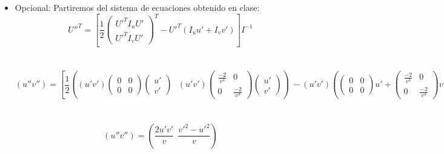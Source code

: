 \documentclass[12pt,a4paper]{article}
\begin{document}
\begin{enumerate}
\begin{center}
  \end{center}
  \begin{itemize}
     \item Opcional:
       Partiremos del sistema de ecuaciones obtenido en clase:
       $$U''^{T} = \left[ \frac{1}{2}
        \left( \begin{array}{c}
           U'^{T}I_{u}U' \\
           U'^{T}I_{v}U'
           \end{array}\right)^{T}-U'^{T}\left(I_{u}u'+I_{v}v'\right)\right]I^{-1} $$\\ \\
 $$\left(u'' v''\right) = \left[ \frac{1}{2}
        \left(
           \left(u' v'\right)
           \left(\begin{array}{cc}
             0 & 0 \\ 
             0 & 0 
           \end{array}\right)
           \left(\begin{array} {c}
             u' \\
             v' 
           \end{array}\right)\ \ \ \left(u' v'\right)
           \left(\begin{array} {cc}
             \frac{-2}{v^{3}} & 0 \\ 
             0 &  \frac{-2}{v^{3}} 
           \end{array}\right)
           \left(\begin{array}{c}
             u' \\ 
             v' 
          
        \end{array} \right) \right)
           \ -
           \left(u' v'\right)
           \left(
           \left(\begin{array}{cc}
             0 & 0 \\ 
             0 & 0 
           \end{array}\right)u'
           +
           \left(\begin{array}{cc}
             \frac{-2}{v^{3}} & 0 \\ 
             0 & \frac{-2}{v^{3}} 
           \end{array}\right)v'\right)\right]
       \left(\begin{array}{cc} 
             v^{2} & 0 \\ 
             0 & v^{2} 
           \end{array}\right) $$\\ \\
       $$\left(u'' v''\right) =
       \left(\frac{2u'v'}{v}\ \ \frac{v'^2-u'^2}{v}\right)$$\ \
       

\end{itemize}
\end{enumerate}
\end{document}
